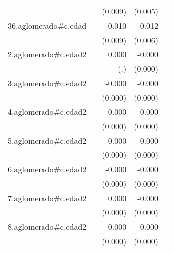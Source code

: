 {\begin{longtable}{l*{4}{D{.}{.}{-1}}}
            &                     &     (0.009)         &     (0.005)         &                     \\
\addlinespace
36.aglomerado#c.edad&                     &      -0.010         &       0.012\sym{*}  &                     \\
            &                     &     (0.009)         &     (0.006)         &                     \\
\addlinespace
2.aglomerado#c.edad2&                     &       0.000         &      -0.000\sym{*}  &                     \\
            &                     &         (.)         &     (0.000)         &                     \\
\addlinespace
3.aglomerado#c.edad2&                     &      -0.000         &      -0.000\sym{***}&                     \\
            &                     &     (0.000)         &     (0.000)         &                     \\
\addlinespace
4.aglomerado#c.edad2&                     &      -0.000\sym{*}  &      -0.000\sym{***}&                     \\
            &                     &     (0.000)         &     (0.000)         &                     \\
\addlinespace
5.aglomerado#c.edad2&                     &       0.000         &      -0.000         &                     \\
            &                     &     (0.000)         &     (0.000)         &                     \\
\addlinespace
6.aglomerado#c.edad2&                     &      -0.000         &      -0.000\sym{***}&                     \\
            &                     &     (0.000)         &     (0.000)         &                     \\
\addlinespace
7.aglomerado#c.edad2&                     &       0.000         &      -0.000         &                     \\
            &                     &     (0.000)         &     (0.000)         &                     \\
\addlinespace
8.aglomerado#c.edad2&                     &      -0.000         &       0.000         &                     \\
            &                     &     (0.000)         &     (0.000)         &                     \\

\end{longtable}}

